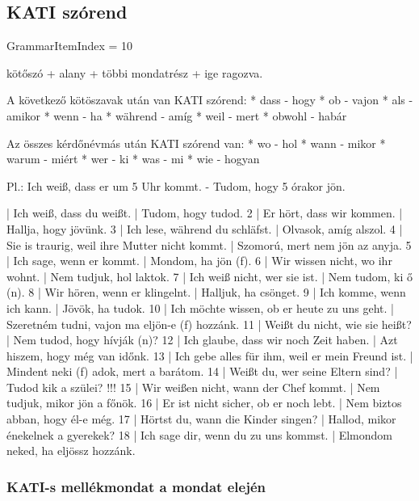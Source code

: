 \documentclass{article}
\newenvironment{desc}{\verbatim}{\endverbatim}
\newenvironment{exmp}{\verbatim}{\endverbatim}
\begin{document}
\subsection{KATI szórend}

GrammarItemIndex = 10

\begin{desc}
kötőszó + alany + többi mondatrész + ige ragozva.

A következő kötöszavak után van KATI szórend:
* dass - hogy
* ob - vajon
* als - amikor
* wenn - ha
* während - amíg
* weil - mert
* obwohl - habár

Az összes kérdőnévmás után KATI szórend van:
* wo - hol
* wann - mikor
* warum - miért
* wer - ki
* was - mi
* wie - hogyan

Pl.: Ich weiß, dass er um 5 Uhr kommt. - Tudom, hogy 5 órakor jön.
\end{desc}

\begin{exmp}
1 | Ich weiß, dass du weißt. | Tudom, hogy tudod.
2 | Er hört, dass wir kommen. | Hallja, hogy jövünk.
3 | Ich lese, während du schläfst. | Olvasok, amíg alszol.
4 | Sie is traurig, weil ihre Mutter nicht kommt. | Szomorú, mert nem jön az anyja.
5 | Ich sage, wenn er kommt. | Mondom, ha jön (f).
6 | Wir wissen nicht, wo ihr wohnt. | Nem tudjuk, hol laktok.
7 | Ich weiß nicht, wer sie ist. | Nem tudom, ki ő (n).
8 | Wir hören, wenn er klingelnt. | Halljuk, ha csönget.
9 | Ich komme, wenn ich kann. | Jövök, ha tudok.
10 | Ich möchte wissen, ob er heute zu uns geht. | Szeretném tudni, vajon ma eljön-e (f) hozzánk.
11 | Weißt du nicht, wie sie heißt? | Nem tudod, hogy hívják (n)?
12 | Ich glaube, dass wir noch Zeit haben. | Azt hiszem, hogy még van időnk.
13 | Ich gebe alles für ihm, weil er mein Freund ist. | Mindent neki (f) adok, mert a barátom.
14 | Weißt du, wer seine Eltern sind? | Tudod kik a szülei? !!!
15 | Wir weißen nicht, wann der Chef kommt. | Nem tudjuk, mikor jön a főnök.
16 | Er ist nicht sicher, ob er noch lebt. | Nem biztos abban, hogy él-e még.
17 | Hörtst du, wann die Kinder singen? | Hallod, mikor énekelnek a gyerekek?
18 | Ich sage dir, wenn du zu uns kommst. | Elmondom neked, ha eljössz hozzánk.
\end{exmp}

\subsubsection{KATI-s mellékmondat a mondat elején}
\end{document}

